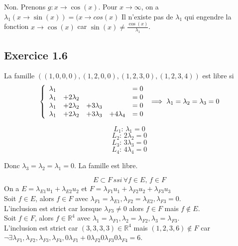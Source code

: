 \documentclass[]{book}
\theoremstyle{definition}
\newcommand{\bb}[1]{\mathbb{#1}}
\newcommand{\R}{\bb{R}}
\begin{document}
Non. Prenons $g: x \to \cos(x)$. Pour $x \to \infty$, on a $\lambda_1(x \to \sin(x)) = (x \to cos(x)$ Il n'existe pas de $\lambda_1$ qui engendre la fonction $x \to \cos(x)$ car $\sin(x) \neq \frac{\cos(x)}{\lambda_1}$.

\subsection*{Exercice 1.6}

La famille $((1, 0, 0, 0), (1, 2, 0, 0), (1, 2, 3, 0), (1, 2, 3, 4))$ est libre si
$$
\left\{ 
\begin{array}{l l l l l}
  \lambda_1 &  &  &   & = 0 \\
  \lambda_1 & +2\lambda_2 &  &   & = 0 \\
  \lambda_1 & +2\lambda_2 & +3\lambda_3 &  & = 0 \\
  \lambda_1 & +2\lambda_2 & +3\lambda_3 & +4\lambda_4  & = 0 \\
\end{array}
\right. 
\implies
\lambda_1=\lambda_2=\lambda_3=0
$$

$$L_1:\,  \lambda_1 = 0$$
$$L_2:\, 2\lambda_2 = 0$$
$$L_3:\, 3\lambda_3 = 0$$
$$L_4:\, 4\lambda_4 = 0$$

Donc $\lambda_3 = \lambda_2 = \lambda_1 = 0$. La famille est libre.

$$E \subset F\, ssi\, \forall f \in E,\, f \in F$$
On a $E = \lambda_{E1} u_1 + \lambda_{E2} u_2$ et $F = \lambda_{F1} u_1 + \lambda_{F2} u_2 + \lambda_{F3} u_3$\\
Soit $f \in E$, alors $f \in F$ avec $\lambda_{F1} = \lambda_{E1}, \lambda_{F2} = \lambda_{E2}, \lambda_{F3} = 0$.\\
L'inclusion est strict car lorsque $\lambda_{F3} \neq 0$ alors $f \in F$ mais $f \notin E$.\\

\medskip
Soit $f \in F$, alors $f \in \R^4$ avec $\lambda_{1} = \lambda_{F1}, \lambda_{2} = \lambda_{F2}, \lambda_{3} = \lambda_{F3}$.\\
L'inclusion est strict car $(3,3,3,3) \in \R^4$ mais $(1,2,3,6) \notin F$ car $\lnot \exists \lambda_{F1},\lambda_{F2},\lambda_{F3},\lambda_{F4}, 0\lambda_{F1} + 0\lambda_{F2} 0\lambda_{F3} 0\lambda_{F4} = 6$.
\end{document}
